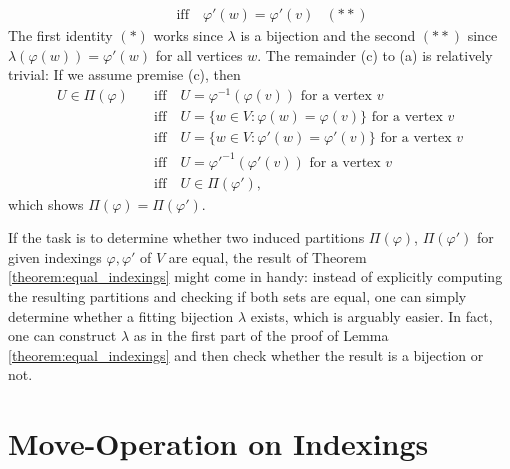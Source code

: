 \documentclass[11pt,a4paper]{article}
\numberwithin{equation}{section}
\newcommand{\idx}{\varphi}
\begin{document}
\begin{appendixproof}
\begin{align*}
        &\quad\text{iff}\quad \idx'(w) = \idx'(v) &(**)
    \end{align*}
    The first identity $(*)$ works since $\lambda$ is a bijection and the second $(**)$ since $\lambda(\idx(w))=\idx'(w)$ for all vertices $w$.
    The remainder (c) to (a) is relatively trivial: If we assume premise (c), then
    \begin{align*}
        U \in \Pi(\idx) &\quad\text{iff}\quad U = \idx^{-1}(\idx(v)) \text{ for a vertex $v$} \\
        &\quad\text{iff}\quad U = \{ w \in V : \idx(w) = \idx(v) \} \text{ for a vertex $v$} \\
        &\quad\text{iff}\quad U = \{ w \in V : \idx'(w) = \idx'(v) \} \text{ for a vertex $v$} \\ 
        &\quad\text{iff}\quad U = \idx'^{-1}(\idx'(v)) \text{ for a vertex $v$} \\
        &\quad\text{iff}\quad U \in \Pi(\idx'),
    \end{align*}
    which shows $\Pi(\idx)=\Pi(\idx')$.
\end{appendixproof}

If the task is to determine whether two induced partitions $\Pi(\idx)$, $\Pi(\idx')$ for given indexings $\idx,\idx'$ of $V$ are equal, the result of Theorem \ref{theorem:equal_indexings} might come in handy: instead of explicitly computing the resulting partitions and checking if both sets are equal, one can simply determine whether a fitting bijection $\lambda$ exists, which is arguably easier. In fact, one can construct $\lambda$ as in the first part of the proof of Lemma \ref{theorem:equal_indexings} and then check whether the result is a bijection or not.


\section{Move-Operation on Indexings}
\end{document}
